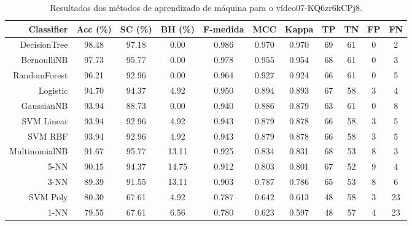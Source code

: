 \begin{table}[!htb]
\centering
\caption{Resultados dos métodos de aprendizado de máquina para o vídeo07-KQ6zr6kCPj8.}
\label{tab:07-KQ6zr6kCPj8}
\begin{tabular}{r|c|c|c|c|c|c|c|c|c|c}
\hline\hline
Classifier & Acc (\%) & SC (\%) & BH (\%) & F-medida & MCC & Kappa & TP & TN & FP & FN \\ \hline
DecisionTree & 98.48 & 97.18 & 0.00 & 0.986 & 0.970 & 0.970 & 69 & 61 & 0 & 2 \\ 
BernoulliNB & 97.73 & 95.77 & 0.00 & 0.978 & 0.955 & 0.954 & 68 & 61 & 0 & 3 \\ 
RandomForest & 96.21 & 92.96 & 0.00 & 0.964 & 0.927 & 0.924 & 66 & 61 & 0 & 5 \\ 
Logistic & 94.70 & 94.37 & 4.92 & 0.950 & 0.894 & 0.893 & 67 & 58 & 3 & 4 \\ 
GaussianNB & 93.94 & 88.73 & 0.00 & 0.940 & 0.886 & 0.879 & 63 & 61 & 0 & 8 \\ 
SVM Linear & 93.94 & 92.96 & 4.92 & 0.943 & 0.879 & 0.878 & 66 & 58 & 3 & 5 \\ 
SVM RBF & 93.94 & 92.96 & 4.92 & 0.943 & 0.879 & 0.878 & 66 & 58 & 3 & 5 \\ 
MultinomialNB & 91.67 & 95.77 & 13.11 & 0.925 & 0.834 & 0.831 & 68 & 53 & 8 & 3 \\ 
5-NN & 90.15 & 94.37 & 14.75 & 0.912 & 0.803 & 0.801 & 67 & 52 & 9 & 4 \\ 
3-NN & 89.39 & 91.55 & 13.11 & 0.903 & 0.787 & 0.786 & 65 & 53 & 8 & 6 \\ 
SVM Poly & 80.30 & 67.61 & 4.92 & 0.787 & 0.642 & 0.613 & 48 & 58 & 3 & 23 \\ 
1-NN & 79.55 & 67.61 & 6.56 & 0.780 & 0.623 & 0.597 & 48 & 57 & 4 & 23 \\ 
\hline\hline
\end{tabular}
\end{table}
